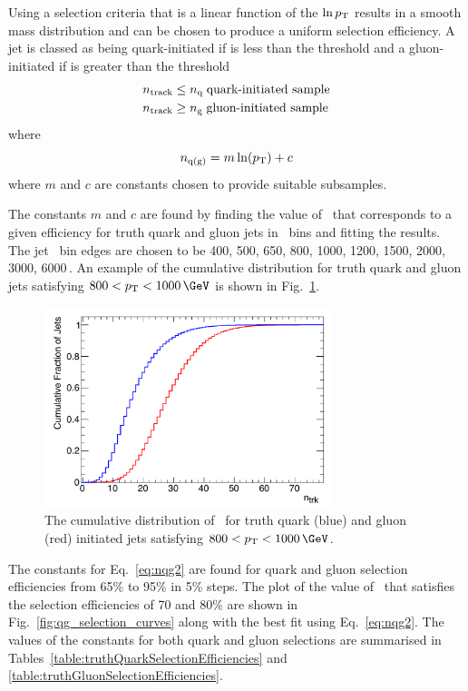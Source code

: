 Using a selection criteria that is a linear function of the \( \ln p_{\mathrm T} \) 
results in a smooth mass distribution and can be chosen to produce a uniform 
selection efficiency.  A jet is classed as being quark-initiated if \ntrk is less than
the threshold \nq and a gluon-initiated if \ntrk is greater than the threshold \ngluon  
\begin{align}
n_{\textrm{track}} & \le n_{\textrm{q}} \; \mbox{quark-initiated sample} \label{eq:QGselect} \\
n_{\textrm{track}}	  & \ge n_{\textrm{g}} \; \mbox{gluon-initiated sample} \nonumber
\end{align}
where   
\begin{equation}
n_{\mathrm{q(g)}} = {m \ln(p_{\mathrm T}) + c}  \label{eq:nqg2}
\end{equation}
where $m$ and $c$ are constants chosen to provide suitable subsamples.

The constants $m$ and $c$ are found by finding the value of \ntrk\ 
that corresponds to a given efficiency for truth quark and gluon jets in 
\pT\ bins and fitting the results. The jet \pT\ bin edges are chosen to be 
400, 500, 650, 800, 1000, 1200, 1500, 2000, 3000, 6000\,\GeV. An example of the \ntrk cumulative 
distribution for truth quark and gluon jets satisfying $800 < \pT < 1000\,\GeV$ is shown in
Fig.~\ref{fig:ntrk_cumulative}.


\begin{figure}[htb]
 \centering
\includegraphics[width=0.75\textwidth]{figures/tagging/Cumulative_ntrk_distribution_4_800_1000GeV.pdf}
\caption{The cumulative distribution of \ntrk\ for truth quark (blue) and gluon (red) initiated jets 
satisfying $800 < \pT < 1000\,\GeV$.  \label{fig:ntrk_cumulative}}
\end{figure}


The constants for Eq.~\ref{eq:nqg2} are found for quark and gluon selection efficiencies from 
65\% to 95\% in 5\% steps. The plot of the value of \ntrk\ that satisfies the selection efficiencies 
of 70 and 80\% are shown in Fig.~\ref{fig:qg_selection_curves} along with the best fit using Eq.~\ref{eq:nqg2}.
The values of the constants for both quark and gluon selections are summarised in 
Tables~\ref{table:truthQuarkSelectionEfficiencies} and \ref{table:truthGluonSelectionEfficiencies}.

